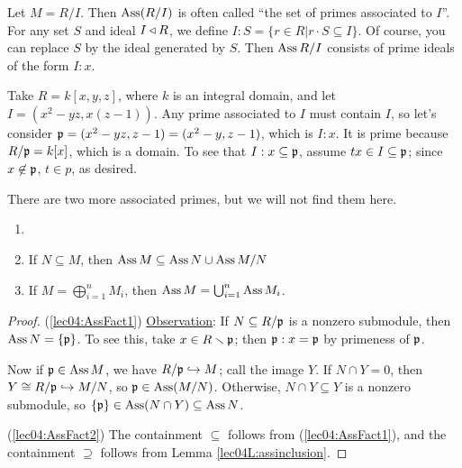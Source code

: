  Let $M = R/I$. Then $\operatorname{Ass} (R/I)$ is often called ``the set of primes associated to
 $I$''. For any set $S$ and ideal $I\triangleleft R$, we define $I:S = \{r\in R|r\cdot S\subseteq
 I\}$. Of course, you can replace $S$ by the ideal generated by $S$. Then $\operatorname{Ass} R/I$
 consists of prime ideals of the form $I:x$.

 \begin{example}
   Take $R=k[x,y,z]$, where $k$ is an integral domain, and let $I = (x^2-yz,x(z-1))$. Any
   prime associated to $I$ must contain $I$, so let's consider
   $\mathfrak{p}=(x^2-yz,z-1)=(x^2-y,z-1)$, which is $I:x$. It is prime because $R/\mathfrak{p} = k[x]$,
   which is a domain. To see that $I:x\subseteq \mathfrak{p}$, assume $tx\in I\subseteq \mathfrak{p}$; since
   $x\not\in \mathfrak{p}$, $t\in p$, as desired.

   There are two more associated primes, but we will not find them here.
 \end{example}

 \begin{proposition}
   \begin{enumerate}
     \item[]
     \item \label{lec04:AssFact1} If $N\subseteq M$, then
        $\operatorname{Ass} M \subseteq \operatorname{Ass} N \cup \operatorname{Ass} M/N$
     \item \label{lec04:AssFact2} If $M = \bigoplus_{i=1}^n M_i$, then
        $\operatorname{Ass} M = \bigcup_{i=1}^n \operatorname{Ass} M_i$.
   \end{enumerate}
 \end{proposition}
 \begin{proof}
   (\ref{lec04:AssFact1}) \underline{Observation}: If $N\subseteq R/\mathfrak{p}$ is a nonzero
   submodule, then $\operatorname{Ass} N=\{\mathfrak{p}\}$. To see this, take $x\in R\smallsetminus \mathfrak{p}$; then
   $\mathfrak{p}:x=\mathfrak{p}$ by primeness of $\mathfrak{p}$.

   Now if $\mathfrak{p}\in \operatorname{Ass} M$, we have $R/\mathfrak{p}\hookrightarrow M$; call the image $Y$. If $N\cap
   Y=0$, then $Y\cong R/\mathfrak{p}\hookrightarrow M/N$, so $\mathfrak{p}\in \operatorname{Ass} (M/N)$. Otherwise, $N\cap
   Y\subseteq Y$ is a nonzero submodule, so $\{\mathfrak{p}\} \in \operatorname{Ass} (N\cap Y)\subseteq \operatorname{Ass} N$.

   (\ref{lec04:AssFact2}) The containment $\subseteq$ follows from
   (\ref{lec04:AssFact1}), and the containment $\supseteq$ follows from Lemma
   \ref{lec04L:assinclusion}.
 \end{proof}

